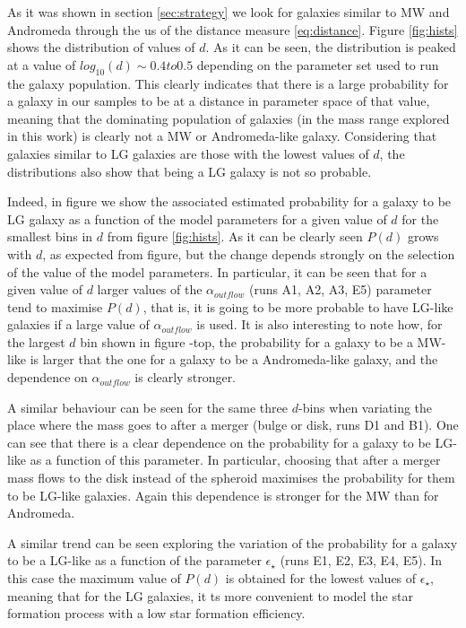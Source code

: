 \documentclass[useAMS,usenatbib]{mn2e}
\begin{document}
As it was shown in section \ref{sec:strategy} we look for galaxies
similar to MW and Andromeda through the us of the distance measure
\ref{eq:distance}. Figure \ref{fig:hists} shows the distribution of
values of $d$. As it can be seen, the distribution is peaked at a
value of $log_{10}(d)\sim 0.4 to 0.5$ depending on the parameter set
used to run the galaxy population. This clearly indicates that there
is a large probability for a galaxy in our samples to be at a distance
in parameter space of that value, meaning that the dominating
population of galaxies (in the mass range explored in this work) is
clearly not a MW or Andromeda-like galaxy. Considering that galaxies
similar to LG galaxies are those with the lowest values of $d$, the
distributions also show that being a LG galaxy is not so probable.

Indeed, in figure \label{fig:fded} we show the associated estimated
probability for a galaxy to be LG galaxy as a function of the model
parameters for a given value of $d$ for the smallest bins in $d$ from
figure \ref{fig:hists}. As it can be clearly seen $P(d)$ grows with
$d$, as expected from figure, but the change depends strongly on the
selection of the value of the model parameters. In particular, it can
be seen that for a given value of $d$ larger values of the
$\alpha_{outflow}$ (runs A1, A2, A3, E5) parameter tend to
maximise $P(d)$, that is, it is going to be more probable to have
LG-like galaxies if a large value of $\alpha_{outflow}$ is used. It is
also interesting to note how, for the largest $d$ bin shown in
figure \label{fig:fded}-top, the probability for a galaxy to be a
MW-like is larger that the one for a galaxy to be a Andromeda-like
galaxy, and the dependence on $\alpha_{outflow}$ is clearly stronger.

A similar behaviour can be seen for the same three $d$-bins when
variating the place where the mass goes to after a merger (bulge or
disk, runs D1 and B1). One can see that there is a clear dependence on
the probability for a galaxy to be LG-like as a function of this
parameter. In particular, choosing that after a merger mass flows to
the disk instead of the spheroid maximises the probability for them to
be LG-like galaxies. Again this dependence is stronger for the MW
than for Andromeda.

A similar trend can be seen exploring the variation of the probability
for a galaxy to be a LG-like as a function of the parameter
$\epsilon_{\star}$ (runs E1, E2, E3, E4, E5). In this case the maximum
value of $P(d)$ is obtained for the lowest values of
$\epsilon_{\star}$, meaning that for the LG galaxies, it ts more
convenient to model the star formation process with a low star
formation efficiency.
\end{document}
